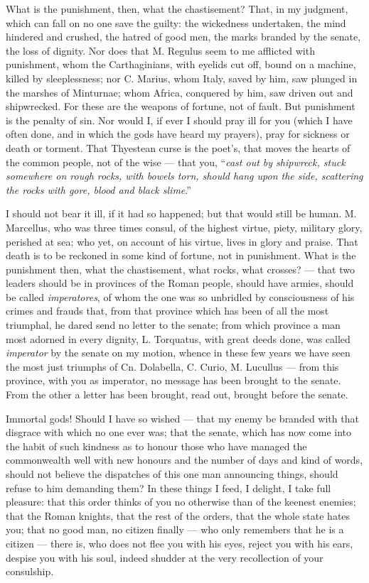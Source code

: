  What is the punishment, then, what the chastisement? That, in my judgment, which can fall on no one save the guilty: the wickedness undertaken, the mind hindered and crushed, the hatred of good men, the marks branded by the senate, the loss of dignity. Nor does that M. Regulus seem to me afflicted with punishment, whom the Carthaginians, with eyelids cut off, bound on a machine, killed by sleeplessness; nor C. Marius, whom Italy, saved by him, saw plunged in the marshes of Minturnae; whom Africa, conquered by him, saw driven out and shipwrecked. For these are the weapons of fortune, not of fault. But punishment is the penalty of sin. Nor would I, if ever I should pray ill for you (which I have often done, and in which the gods have heard my prayers), pray for sickness or death or torment. That Thyestean curse is the poet's, that moves the hearts of the common people, not of the wise — that you, ``\textit{cast out by shipwreck, stuck somewhere on rough rocks, with bowels torn, should hang upon the side, scattering the rocks with gore, blood and black slime}.''

 I should not bear it ill, if it had so happened; but that would still be human. M. Marcellus, who was three times consul, of the highest virtue, piety, military glory, perished at sea; who yet, on account of his virtue, lives in glory and praise. That death is to be reckoned in some kind of fortune, not in punishment. What is the punishment then, what the chastisement, what rocks, what crosses? — that two leaders should be in provinces of the Roman people, should have armies, should be called \textit{imperatores}, of whom the one was so unbridled by consciousness of his crimes and frauds that, from that province which has been of all the most triumphal, he dared send no letter to the senate; from which province a man most adorned in every dignity, L. Torquatus, with great deeds done, was called \textit{imperator} by the senate on my motion, whence in these few years we have seen the most just triumphs of Cn. Dolabella, C. Curio, M. Lucullus — from this province, with you as imperator, no message has been brought to the senate. From the other a letter has been brought, read out, brought before the senate.

 Immortal gods! Should I have so wished — that my enemy be branded with that disgrace with which no one ever was; that the senate, which has now come into the habit of such kindness as to honour those who have managed the commonwealth well with new honours and the number of days and kind of words, should not believe the dispatches of this one man announcing things, should refuse to him demanding them? In these things I feed, I delight, I take full pleasure: that this order thinks of you no otherwise than of the keenest enemies; that the Roman knights, that the rest of the orders, that the whole state hates you; that no good man, no citizen finally — who only remembers that he is a citizen — there is, who does not flee you with his eyes, reject you with his ears, despise you with his soul, indeed shudder at the very recollection of your consulship.

